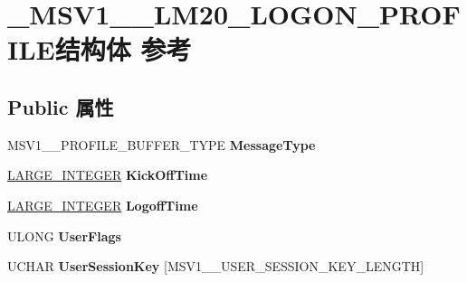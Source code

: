 \hypertarget{struct___m_s_v1__0___l_m20___l_o_g_o_n___p_r_o_f_i_l_e}{}\section{\+\_\+\+M\+S\+V1\+\_\+\_\+\+L\+M20\+\_\+\+L\+O\+G\+O\+N\+\_\+\+P\+R\+O\+F\+I\+L\+E结构体 参考}
\label{struct___m_s_v1__0___l_m20___l_o_g_o_n___p_r_o_f_i_l_e}
\subsection*{Public 属性}
\begin{DoxyCompactItemize}
\item 
\mbox{\label{struct___m_s_v1__0___l_m20___l_o_g_o_n___p_r_o_f_i_l_e_a0d2ff4e6f6cccbf9e844c8bee5f79d22}} 
M\+S\+V1\+\_\+\_\+\+P\+R\+O\+F\+I\+L\+E\+\_\+\+B\+U\+F\+F\+E\+R\+\_\+\+T\+Y\+PE {\bfseries Message\+Type}
\item 
\mbox{\label{struct___m_s_v1__0___l_m20___l_o_g_o_n___p_r_o_f_i_l_e_aef954bf73587f1d12acb154778794324}} 
\hyperlink{union___l_a_r_g_e___i_n_t_e_g_e_r}{L\+A\+R\+G\+E\+\_\+\+I\+N\+T\+E\+G\+ER} {\bfseries Kick\+Off\+Time}
\item 
\mbox{\label{struct___m_s_v1__0___l_m20___l_o_g_o_n___p_r_o_f_i_l_e_ae9f7ff2cfd2c0452751b944385b7f812}} 
\hyperlink{union___l_a_r_g_e___i_n_t_e_g_e_r}{L\+A\+R\+G\+E\+\_\+\+I\+N\+T\+E\+G\+ER} {\bfseries Logoff\+Time}
\item 
\mbox{\label{struct___m_s_v1__0___l_m20___l_o_g_o_n___p_r_o_f_i_l_e_a7da7b03939df5a4f6d166b49937b1f5a}} 
U\+L\+O\+NG {\bfseries User\+Flags}
\item 
\mbox{\label{struct___m_s_v1__0___l_m20___l_o_g_o_n___p_r_o_f_i_l_e_a60d271d047f71574e3c6652a06325abd}} 
U\+C\+H\+AR {\bfseries User\+Session\+Key} \mbox{[}M\+S\+V1\+\_\+\_\+\+U\+S\+E\+R\+\_\+\+S\+E\+S\+S\+I\+O\+N\+\_\+\+K\+E\+Y\+\_\+\+L\+E\+N\+G\+TH\mbox{]}

\end{DoxyCompactItemize}
